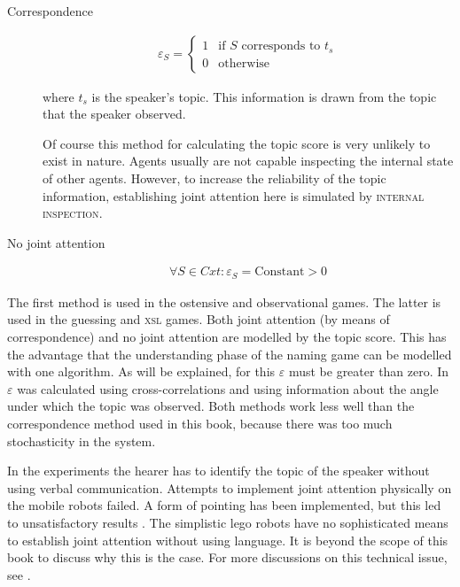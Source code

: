 \begin{description}
\item[Correspondence]
\begin{eqnarray}\varepsilon_S = \left \{ \begin{array}{rl}
1 & \mbox{if } S \mbox{ corresponds to } t_s\\
0 & \mbox{otherwise}
\end{array}
\right.
\end{eqnarray}

\noindent
where $t_s$ is the speaker's topic. This information is drawn from the topic that the speaker observed.

Of course this method for calculating the topic score is very unlikely to exist in nature. Agents usually are not capable inspecting the internal state of other agents. However, to increase the reliability of the topic information, establishing joint attention here is simulated by {\scshape internal inspection}.

\item[No joint attention]
\begin{eqnarray}
\forall S \in Cxt: \varepsilon_S=\mbox{Constant}>0
\end{eqnarray}
\end{description}

\noindent
The first method is used in the ostensive and observational games. The latter is used in the guessing and {\scshape xsl} games. Both joint attention (by means of correspondence) and no joint attention are modelled by the topic score. This has the advantage that the understanding phase of the naming game can be modelled with one algorithm. As will be explained, for this $\varepsilon$ must be greater than zero. In \citet{vogt:1998b} $\varepsilon$ was calculated using cross-correlations and using information about the angle under which the topic was observed. Both methods work less well than the correspondence method used in this book, because there was too much stochasticity in the system.

In the experiments the hearer has to identify the topic of the speaker without using verbal communication. Attempts to implement joint attention physically on the mobile robots failed. A form of pointing has been implemented, but this led to unsatisfactory results \citep{steelsvogt:1997,vogt:1998a}. The simplistic {\sc lego} robots have no sophisticated means to establish joint attention without using language. It is beyond the scope of this book to discuss why this is the case. For more discussions on this technical issue, see \citealt{vogt:1998b,vogt:1998c}. 

